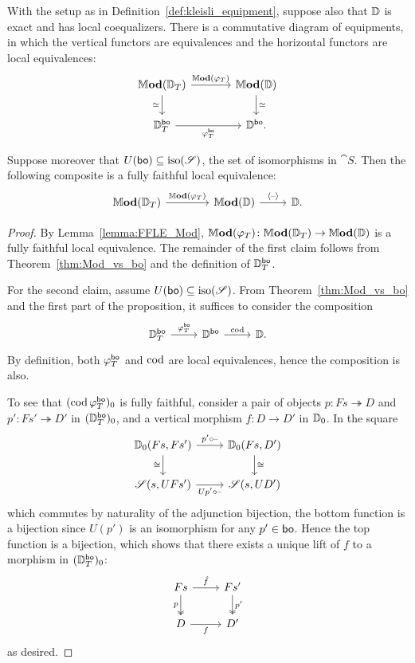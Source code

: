 \documentclass[11pt,oneside,article]{memoir}
\begin{document}
\begin{proposition}
      \label{prop:objectfree_Mod_bo}
With the setup as in Definition~\ref{def:kleisli_equipment}, suppose also that $\mathbb{D}$ is exact
and has local coequalizers. There is a commutative diagram of equipments, in which the vertical
functors are equivalences and the horizontal functors are local equivalences:
   \[ \begin{tikzcd}[column sep=large]
      \dMod(\dcat{D}_T) \ar[r,"\dMod(\varphi_T)"] \ar[d,"\equiv"']
         & \dMod(\dcat{D}) \ar[d,"\equiv"] \\
      \dcat{D}_T^{\bo} \ar[r,"\varphi_T^{\bo}"'] & \dcat{D}^{\bo}.
   \end{tikzcd} \]

   Suppose moreover that $U(\mathsf{bo})\subseteq\mathrm{iso}(\mathscr{S})$, the set of isomorphisms in $\cat{S}$. Then the following composite is a
   fully faithful local equivalence:
   \[ \begin{tikzcd}
      \dMod(\dcat{D}_T)\ar[r,"\dMod(\varphi_T)"] &[1.5em] \dMod(\dcat{D}) \ar[r,"\ColDash"] & \dcat{D}.
   \end{tikzcd} \]
\end{proposition}
\begin{proof}
   By Lemma~\ref{lemma:FFLE_Mod}, $\mathbb{M}\mathbf{od}(\varphi_T)\colon\mathbb{M}\mathbf{od}(\mathbb{D}_T)\to\mathbb{M}\mathbf{od}(\mathbb{D})$ is a fully faithful local equivalence. The remainder of the first claim follows from Theorem~\ref{thm:Mod_vs_bo} and the definition of $\mathbb{D}_T^{\mathsf{bo}}$.

   For the second claim, assume $U(\mathsf{bo})\subseteq\mathrm{iso}(\mathscr{S})$. From Theorem~\ref{thm:Mod_vs_bo} and the first part of the proposition, it suffices to consider the composition
   \[ \begin{tikzcd}
      \dcat{D}_T^{\bo} \ar[r,"\varphi_T^{\bo}"] & \dcat{D}^{\bo} \ar[r,"\cod"] & \dcat{D}.
   \end{tikzcd} \]
   By definition, both $\varphi_T^{\mathsf{bo}}$ and $\operatorname{cod}$ are local equivalences, hence the composition is also.

   To see that $(\operatorname{cod}\varphi_T^{\mathsf{bo}})_0$ is fully faithful, consider a pair of objects $p\colon
   Fs\twoheadrightarrow D$ and $p'\colon Fs'\twoheadrightarrow D'$ in $(\mathbb{D}_T^{\mathsf{bo}})_0$, and a
   vertical morphism $f\colon D\to D'$ in $\mathbb{D}_0$. In the square
   \[ \begin{tikzcd}
      \dcat{D}_0(Fs,Fs') \ar[r,"p'\circ\textrm{--}"] \ar[d,"\iso"']
         & \dcat{D}_0(Fs,D') \ar[d,"\iso"] \\
      \cat{S}(s,UFs') \ar[r,"Up'\circ\textrm{--}"']
         & \cat{S}(s,UD')
   \end{tikzcd} \]
   which commutes by naturality of the adjunction bijection, the bottom function is a bijection
   since $U(p')$ is an isomorphism for any $p'\in\mathsf{bo}$. Hence the top
   function is a bijection, which shows that there exists a unique lift of $f$ to a morphism in
   $(\mathbb{D}_T^{\mathsf{bo}})_0$:
   \[ \begin{tikzcd}
      Fs \ar[r,"\hat{f}"] \ar[d,two heads,"p"']
         & Fs' \ar[d,two heads,"p'"] \\
      D \ar[r,"f"'] & D'
   \end{tikzcd} \]
   as desired.
\end{proof}
\end{document}
